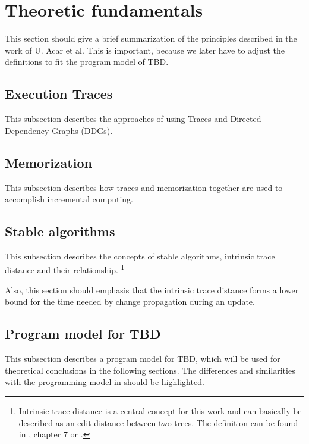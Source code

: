 \section{Theoretic fundamentals}
\label{sec:ddg_memo}
This section should give a brief summarization of the principles described in the work of U. Acar et al. This  is important, because we later have to adjust the definitions to fit the program model of TBD. \cite{Acar2005thesis}

\subsection{Execution Traces}
This subsection describes the approaches of using Traces and Directed Dependency Graphs (DDGs). \cite{Acar2005thesis}

\subsection{Memorization}
This subsection describes how traces and memorization together are used to accomplish incremental computing. \cite{Acar2005thesis}

\subsection{Stable algorithms}
This subsection describes the concepts of stable algorithms, intrinsic trace distance and their relationship. 
\footnote{Intrinsic trace distance is a central concept for this work and can basically be described as an edit distance between two trees. 
The definition can be found in \cite{Acar2005thesis}, chapter 7 or \cite{acar2004dynamizing}.}

Also, this section should emphasis that the intrinsic trace distance forms a lower bound for the time needed by change propagation during an update. \cite{Acar2005thesis} 

\subsection{Program model for TBD}
This subsection describes a program model for TBD, which will be used for theoretical conclusions in the following sections. The differences and similarities with the programming model in \cite{Acar2005thesis} should be highlighted.